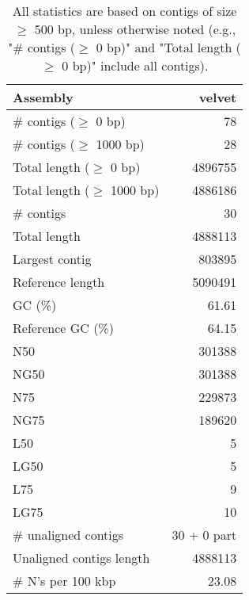 \documentclass[12pt,a4paper]{article}
\begin{document}
\begin{table}[ht]
\begin{center}
\caption{All statistics are based on contigs of size $\geq$ 500 bp, unless otherwise noted (e.g., "\# contigs ($\geq$ 0 bp)" and "Total length ($\geq$ 0 bp)" include all contigs).}
\begin{tabular}{|l*{1}{|r}|}
\hline
Assembly & velvet \\ \hline
\# contigs ($\geq$ 0 bp) & 78 \\ \hline
\# contigs ($\geq$ 1000 bp) & 28 \\ \hline
Total length ($\geq$ 0 bp) & 4896755 \\ \hline
Total length ($\geq$ 1000 bp) & 4886186 \\ \hline
\# contigs & 30 \\ \hline
Total length & 4888113 \\ \hline
Largest contig & 803895 \\ \hline
Reference length & 5090491 \\ \hline
GC (\%) & 61.61 \\ \hline
Reference GC (\%) & 64.15 \\ \hline
N50 & 301388 \\ \hline
NG50 & 301388 \\ \hline
N75 & 229873 \\ \hline
NG75 & 189620 \\ \hline
L50 & 5 \\ \hline
LG50 & 5 \\ \hline
L75 & 9 \\ \hline
LG75 & 10 \\ \hline
\# unaligned contigs & 30 + 0 part \\ \hline
Unaligned contigs length & 4888113 \\ \hline
\# N's per 100 kbp & 23.08 \\ \hline
\end{tabular}
\end{center}
\end{table}
\end{document}
